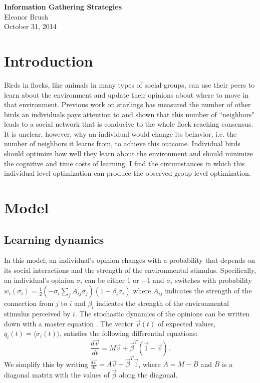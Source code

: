 \documentclass{article}
\begin{document}
\begin{center}
{\bf \LARGE{Information Gathering Strategies}}
\vspace{10pt}
\\ Eleanor Brush
\\ October 31, 2014
\end{center}

\tableofcontents

\section{Introduction}
Birds in flocks, like animals in many types of social groups, can use their peers to learn about the environment and update their opinions about where to move in that environment.  Previous work on starlings has measured the number of other birds an individuals pays attention to and shown that this number of ``neighbors" leads to a social network that is conducive to the whole flock reaching consensus.  It is unclear, however, why an individual would change its behavior, i.e. the number of neighbors it learns from, to achieve this outcome.  Individual birds should optimize how well they learn about the environment and should minimize the cognitive and time costs of learning.  I find the circumstances in which this individual level optimization can produce the observed group level optimization.


\section{Model }
\subsection{Learning dynamics}
In this model, an individual's opinion changes with a probability that depends on its social interactions and the strength of the environmental stimulus. Specifically, an individual's opinion $\sigma_i$ can be either $1$ or $-1$ and $\sigma_i$ switches with probability $w_i(\sigma_i)=\frac{1}{2}(-\sigma_i\sum_jA_{ij}\sigma_j )(1-\beta_i\sigma_i)$ where $A_{ij}$ indicates the strength of the connection from $j$ to $i$ and $\beta_i$ indicates the strength of the environmental stimulus perceived by $i$.  The stochastic dynamics of the opinions can be written down with a master equation \cite{Glauber:1963fk}.  The vector $\vec{v}(t)$ of expected values, $q_i(t)=\langle \sigma_i(t)\rangle$, satisfies the following differential equations: \cite{Glauber:1963fk}
\begin{equation*}
\frac{d\vec{v}}{dt}=M\vec{v}+\vec{\beta}^T(\vec{1}-\vec{v}).
\end{equation*}
We simplify this by writing $\frac{d\vec{v}}{dt}=A\vec{v}+\vec{\beta}^T\vec{1}$, where $A=M-B$ and $B$ is a diagonal matrix with the values of $\vec{\beta}$ along the diagonal.
\end{document}
